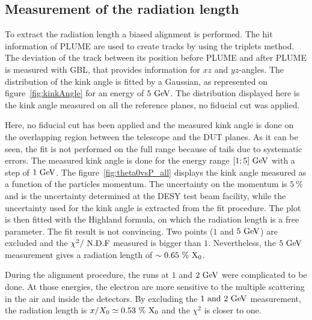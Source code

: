    \subsection{Measurement of the radiation length}

   To extract the radiation length a biased alignment is performed.
   The hit information of \gls{PLUME} are used to create tracks by using the triplets method.
   The deviation of the track between its position before \gls{PLUME} and after \gls{PLUME} is measured with \gls{GBL}, that provides information for $xz$ and $yz$-angles.
   The distribution of the kink angle is fitted by a Gaussian, as represented on figure~\ref{fig:kinkAngle} for an energy of $5~\rm{GeV}$.
   The distribution displayed here is the kink angle measured on all the reference planes, no fiducial cut was applied. 

%
   Here, no fiducial cut has been applied and the measured kink angle is done on the overlapping region between the telescope and the \gls{DUT} planes.
   As it can be seen, the fit is not performed on the full range because of tails due to systematic errors.
   The measured kink angle is done for the energy range $[1; 5]~\rm{GeV}$ with a step of $1~\rm{GeV}$.
   The figure~\ref{fig:theta0vsP_all} displays the kink angle measured as a function of the particles momentum.
   The uncertainty on the momentum is $5~\%$ and is the uncertainty determined at the DESY test beam facility, while the uncertainty used for the kink angle is extracted from the fit procedure.
   The plot is then fitted with the Highland formula, on which the radiation length is a free parameter.
   The fit result is not convincing.
   Two points ($1$ and $5~\rm{GeV}$) are excluded and the $\chi^2 /~\rm{N.D.F}$ measured is bigger than $1$.
   Nevertheless, the $5~\rm{GeV}$ measurement gives a radiation length of $\sim 0.65~\%~\rm{X_{0}} $.

   During the alignment procedure, the runs at $1$ and $2~\rm{GeV}$ were complicated to be done.
   At those energies, the electron are more sensitive to the multiple scattering in the air and inside the detectors.
   By excluding the $1~\rm{and}~2~\rm{GeV}$ measurement, the radiation length is $x/X_0 \simeq 0.53~\%~\rm{X_{0}}$ and the $\chi^2$ is closer to one.

